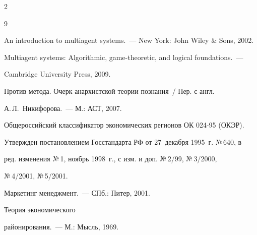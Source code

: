 \begin{multicols}{2}
{{\begin{thebibliography}{9}




An introduction to multiagent systems.~--- New York: John Wiley \& Sons, 2002.









Multiagent systems: Algorithmic, game-theoretic, and logical foundations.~--- 


Cambridge University Press, 2009.









Против метода. Очерк анархистской тео\-рии познания~/ Пер. с англ. 


А.\,Л.~Никифорова.~--- М.: АСТ, 2007. 







Общероссийский классификатор экономических регионов ОК 024-95 (ОКЭР). 


Утвержден постановлением Госстандарта РФ от 27~декабря 1995~г. №\,640, в 


ред. изменения №\,1, ноябрь 1998~г., с изм. и доп. №\,2/99, №\,3/2000, 


№\,4/2001, №\,5/2001.









Маркетинг менеджмент.~--- СПб.: Питер, 2001.





 \label{end\stat}









Теория экономического 


районирования.~--- М.: Мысль, 1969.








 \end{thebibliography}


}


}








\end{multicols}  


